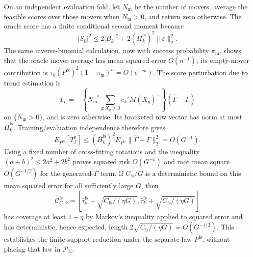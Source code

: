 On an independent evaluation fold, let \(N_{\mathrm m}\) be the number of movers, average the feasible scores over those movers when \(N_{\mathrm m}>0\), and return zero otherwise.  The oracle score has a finite conditional second moment because
\[
|S_k|^2
\le 2|B_k|^2+2(\overline H_k^{\mathrm{fs}})^2\lVert\varepsilon\rVert_2^2.
\]
The same inverse-binomial calculation, now with success probability \(\pi_{\mathrm m}\), shows that the oracle mover average has mean squared error \(O(n^{-1})\); its empty-mover contribution is \(\tau_k(P^{\mathrm{fs}})^2(1-\pi_{\mathrm m})^n=O(e^{-cn})\).  The score perturbation due to trend estimation is
\[
T_\Gamma=-\left\{N_{\mathrm m}^{-1}
\sum_{g:X_g\ne0}e_k'M(X_g)^+\right\}(\widehat\Gamma-\Gamma)
\]
on \(\{N_{\mathrm m}>0\}\), and is zero otherwise.  Its bracketed row vector has norm at most \(\overline H_k^{\mathrm{fs}}\).  Training/evaluation independence therefore gives
\[
E_{P^{\mathrm{fs}}}[T_\Gamma^2]
\le (\overline H_k^{\mathrm{fs}})^2
E_{P^{\mathrm{fs}}}\lVert\widehat\Gamma-\Gamma\rVert_2^2
=O(G^{-1}).
\]
Using a fixed number of cross-fitting rotations and the inequality \((a+b)^2\le2a^2+2b^2\) proves squared risk \(O(G^{-1})\) and root mean square \(O(G^{-1/2})\) for the generated-\(\Gamma\) term.  If \(C_{\mathrm{fs}}/G\) is a deterministic bound on this mean squared error for all sufficiently large \(G\), then
\[
\mathcal C_{G,k}^{\mathrm{fs}}
=\left[
\widehat\tau_k^{\mathrm{fs}}-\sqrt{C_{\mathrm{fs}}/(\eta G)},
\widehat\tau_k^{\mathrm{fs}}+\sqrt{C_{\mathrm{fs}}/(\eta G)}
\right]
\]
has coverage at least \(1-\eta\) by Markov's inequality applied to squared error and has deterministic, hence expected, length \(2\sqrt{C_{\mathrm{fs}}/(\eta G)}=O(G^{-1/2})\).  This establishes the finite-support reduction under the separate law \(P^{\mathrm{fs}}\), without placing that law in \(\mathcal P_\Sigma\).

